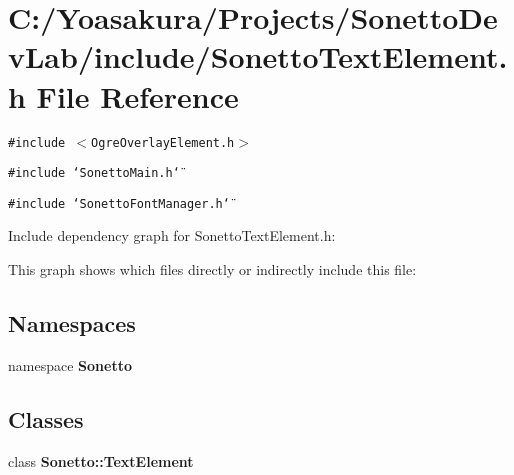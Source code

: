 \section{C:/Yoasakura/Projects/SonettoDevLab/include/SonettoTextElement.h File Reference}
\label{_sonetto_text_element_8h}
{\tt \#include $<$OgreOverlayElement.h$>$}\par
{\tt \#include \char`\"{}SonettoMain.h\char`\"{}}\par
{\tt \#include \char`\"{}SonettoFontManager.h\char`\"{}}\par


Include dependency graph for SonettoTextElement.h:

This graph shows which files directly or indirectly include this file:\subsection*{Namespaces}
\begin{CompactItemize}
\item 
namespace {\bf Sonetto}
\end{CompactItemize}
\subsection*{Classes}
\begin{CompactItemize}
\item 
class {\bf Sonetto::TextElement}
\end{CompactItemize}
